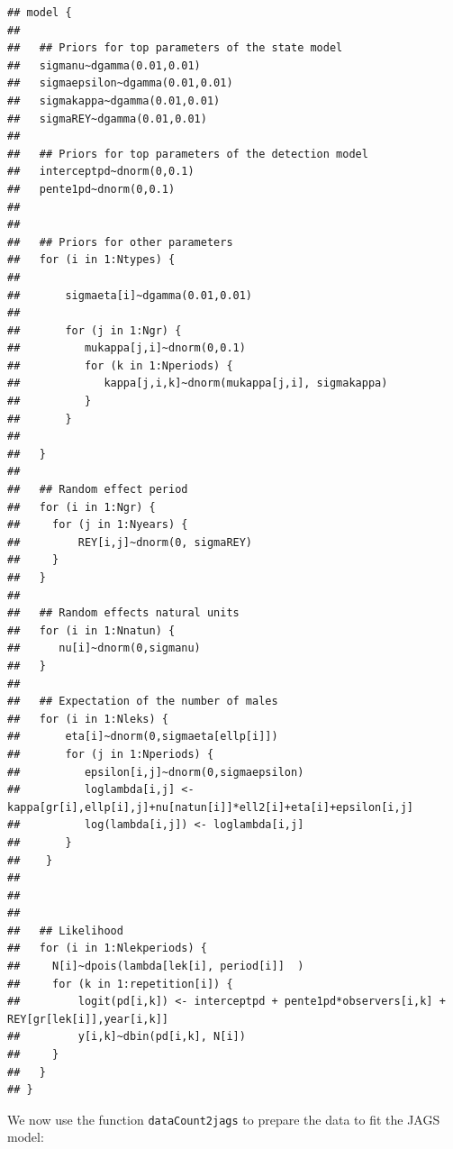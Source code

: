 \documentclass[a4paper]{article}
\newenvironment{Default Paragraph Font}{}{}
\begin{document}
\begin{knitrout}
\color{fgcolor}\begin{kframe}
\begin{alltt}
\end{alltt}
\begin{verbatim}
## model {
## 
##   ## Priors for top parameters of the state model
##   sigmanu~dgamma(0.01,0.01)
##   sigmaepsilon~dgamma(0.01,0.01)
##   sigmakappa~dgamma(0.01,0.01)
##   sigmaREY~dgamma(0.01,0.01)
## 
##   ## Priors for top parameters of the detection model
##   interceptpd~dnorm(0,0.1)
##   pente1pd~dnorm(0,0.1)
## 
## 
##   ## Priors for other parameters
##   for (i in 1:Ntypes) {
## 
##       sigmaeta[i]~dgamma(0.01,0.01)
## 
##       for (j in 1:Ngr) {
##          mukappa[j,i]~dnorm(0,0.1)
##          for (k in 1:Nperiods) {
##             kappa[j,i,k]~dnorm(mukappa[j,i], sigmakappa)
##          }
##       }
## 
##   }
## 
##   ## Random effect period
##   for (i in 1:Ngr) {
##     for (j in 1:Nyears) {
##         REY[i,j]~dnorm(0, sigmaREY)
##     }
##   }
## 
##   ## Random effects natural units
##   for (i in 1:Nnatun) {
##      nu[i]~dnorm(0,sigmanu)
##   }
## 
##   ## Expectation of the number of males
##   for (i in 1:Nleks) {
##       eta[i]~dnorm(0,sigmaeta[ellp[i]])
##       for (j in 1:Nperiods) {
##          epsilon[i,j]~dnorm(0,sigmaepsilon)
##          loglambda[i,j] <- kappa[gr[i],ellp[i],j]+nu[natun[i]]*ell2[i]+eta[i]+epsilon[i,j]
##          log(lambda[i,j]) <- loglambda[i,j]
##       }
##    }
## 
## 
## 
##   ## Likelihood
##   for (i in 1:Nlekperiods) {
##     N[i]~dpois(lambda[lek[i], period[i]]  )
##     for (k in 1:repetition[i]) {
##         logit(pd[i,k]) <- interceptpd + pente1pd*observers[i,k] + REY[gr[lek[i]],year[i,k]]
##         y[i,k]~dbin(pd[i,k], N[i])
##     }
##   }
## }
\end{verbatim}
\end{kframe}
\end{knitrout}


We now use the function \texttt{dataCount2jags} to prepare the data
to fit the JAGS model:


\begin{knitrout}
\color{fgcolor}\begin{kframe}
\begin{alltt}
 \hlkwb{<-} \hlopt{$}\hlopt{$}
                           \hlopt{$}\hlopt{$}
                           \hlopt{$} \hlstd{(}\hlopt{$}
                           \hlopt{$}\hlopt{$}
\end{alltt}
\end{kframe}
\end{knitrout}
\end{document}

